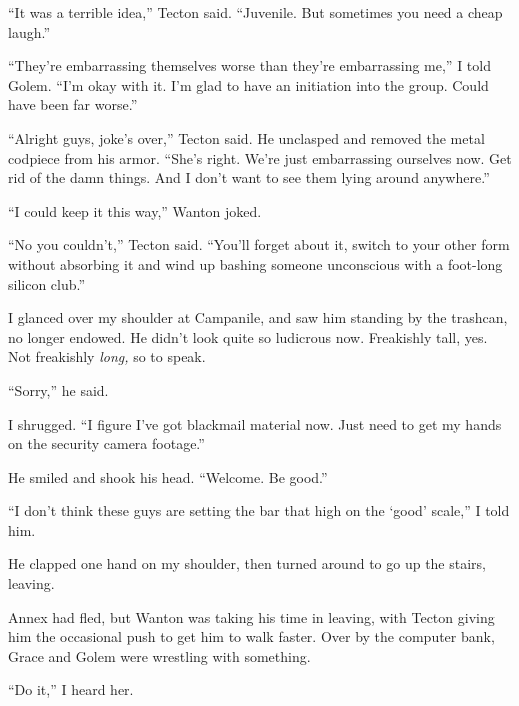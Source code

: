 ``It was a terrible idea,'' Tecton said.  ``Juvenile.  But sometimes you need a cheap laugh.''



``They're embarrassing themselves worse than they're embarrassing me,'' I told Golem.  ``I'm okay with it.  I'm glad to have an initiation into the group.  Could have been far worse.''



``Alright guys, joke's over,'' Tecton said.  He unclasped and removed the metal codpiece from his armor.  ``She's right.  We're just embarrassing ourselves now.  Get rid of the damn things.  And I don't want to see them lying around anywhere.''



``I could keep it this way,'' Wanton joked.



``No you couldn't,'' Tecton said.  ``You'll forget about it, switch to your other form without absorbing it and wind up bashing someone unconscious with a foot-long silicon club.''



I glanced over my shoulder at Campanile, and saw him standing by the trashcan, no longer endowed.  He didn't look quite so ludicrous now.  Freakishly tall, yes.  Not freakishly \emph{long, }so to speak.



``Sorry,'' he said.



I shrugged.  ``I figure I've got blackmail material now.  Just need to get my hands on the security camera footage.''



He smiled and shook his head.  ``Welcome.  Be good.''



``I don't think these guys are setting the bar that high on the `good' scale,'' I told him.



He clapped one hand on my shoulder, then turned around to go up the stairs, leaving.



Annex had fled, but Wanton was taking his time in leaving, with Tecton giving him the occasional push to get him to walk faster.  Over by the computer bank, Grace and Golem were wrestling with something.



``Do it,'' I heard her.



